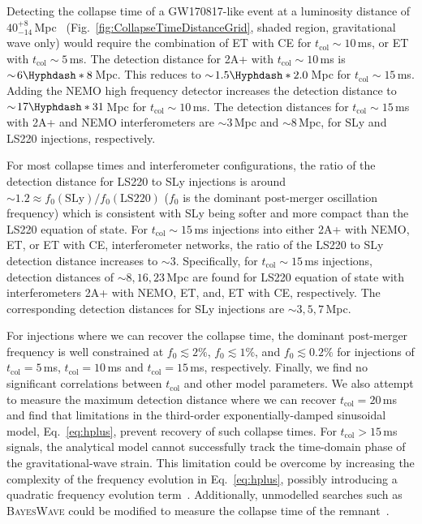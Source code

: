 \documentclass[
reprint,
prd,
twocolumn,
nofootinbib,
 amsmath,
showpacs ,amssymb, aps,%
superscriptaddress
]{revtex4-1}
\newcommand{\tc}{t_{\mathrm{col}}}
\begin{document}
    Detecting the collapse time of a GW170817-like event at a luminosity distance of $40^{+8}_{-14}$\,Mpc~\cite{GW170817multi} (Fig.~\ref{fig:CollapseTimeDistanceGrid}, shaded region, gravitational wave only) would require the combination of ET with CE for $\tc \sim\!10$\,ms,  or ET with $\tc \sim\!5$\,ms. 
    The detection distance for 2A+ with  $\tc\sim\!10$\,ms is $\sim\!6\Hyphdash*8$\,Mpc.  
    This reduces to $\sim\!1.5\Hyphdash*2.0$\,Mpc for $\tc \sim\!15$\,ms. 
    Adding the NEMO high frequency detector increases the detection distance to $\sim\!17\Hyphdash*31$\,Mpc  for $\tc \sim\!10$\,ms.
    The detection distances for $\tc\sim\!15$\,ms with 2A+ and NEMO interferometers are $\sim\!3$\,Mpc and $\sim\!8$\,Mpc, for SLy and LS220 injections, respectively.\par
    
    
    For most collapse times and interferometer configurations, the ratio of the detection distance for LS220 to SLy injections is around $\sim\!1.2\approx f_0(\mathrm{SLy}) / f_0(\mathrm{LS220})$ ($f_0$ is the dominant post-merger oscillation frequency) which is consistent with SLy being softer and more compact than the LS220 equation of state. 
    For $\tc\!\sim15$\,ms injections into either 2A+ with NEMO, ET, or ET with CE, interferometer networks, the ratio of the LS220 to SLy detection distance increases to $\sim\!3$.
    Specifically, for $\tc\!\sim15$\,ms injections, detection distances of $\sim\!8,16,23$\,Mpc are found for LS220 equation of state with interferometers 2A+ with NEMO, ET, and, ET with CE, respectively.
    The corresponding detection distances for SLy injections are $\sim\!3,5,7$\,Mpc. 
    \par
    For injections where we can recover the collapse time, the dominant post-merger frequency is well constrained at $f_0 \lesssim 2\%$, $f_0 \lesssim 1\%$, and $f_0 \lesssim 0.2\%$ for injections of $\tc=5$\,ms, $\tc=10$\,ms and $\tc=15$\,ms, respectively. 
    Finally, we find no significant correlations between $\tc$ and other model parameters.
    We also attempt to measure the maximum detection distance where we can recover $\tc=20$\,ms and find that limitations in the third-order exponentially-damped sinusoidal model, Eq.~\ref{eq:hplus}, prevent recovery of such collapse times.
    For $\tc > 15$\,ms signals, the analytical model cannot successfully track the time-domain phase of the gravitational-wave strain.
    This limitation could be overcome by increasing the complexity of the frequency evolution in Eq.~\ref{eq:hplus}, possibly introducing a quadratic frequency evolution term~\cite{Bose2018}.
    Additionally, unmodelled searches such as \textsc{BayesWave} could be modified to measure the collapse time of the remnant~\cite{Cornish2015,Littenberg2015,Chatziioannou2017,Torres-Rivas2019}.\par
\vspace{-0.25cm}
\end{document}
